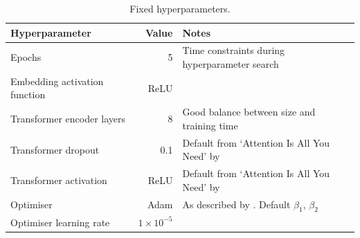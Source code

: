 \begin{table}[H]
  \centering
  \begin{adjustbox}{width=\textwidth}
    \begin{tabular}{l|rl}

      Hyperparameter & Value & Notes \\
      \hline

      Epochs & 5 & Time constraints during hyperparameter search \\

      Embedding activation function & ReLU & \\

      Transformer encoder layers & 8 & Good balance between size and training
      time \\

      Transformer dropout & 0.1 & Default from `Attention Is All You Need' by
      \citet{attention}\\

      Transformer activation & ReLU & Default from `Attention Is All You Need'
      by \citet{attention} \\

      Optimiser & Adam & As described by \citet{kingma2014adam}. Default
      $\beta_1$, $\beta_2$ \\

      Optimiser learning rate & $1\times10^{-5}$ &

    \end{tabular}
  \end{adjustbox}
  \caption{Fixed hyperparameters.}
  \label{tabFixedparam}
\end{table}


